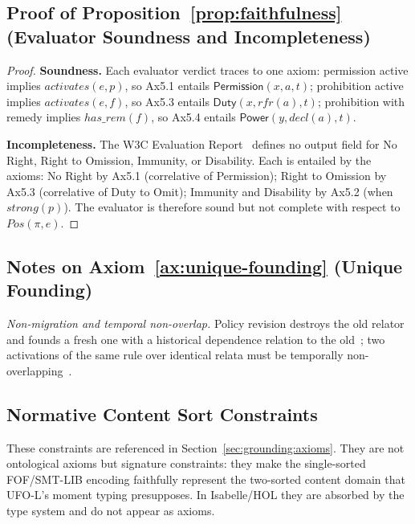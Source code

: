 \documentclass{IOS-Book-Article}
\newcommand{\activates}{\mathit{activates}}
\newcommand{\hasrem}{\mathit{has\_rem}}
\newcommand{\PermPos}{\mathsf{Permission}}   %
\newcommand{\Duty}{\mathsf{Duty}}            %
\newcommand{\Power}{\mathsf{Power}}          %
\theoremstyle{definition}
\begin{document}
\subsection*{Proof of Proposition~\ref{prop:faithfulness}
  (Evaluator Soundness and Incompleteness)}
\label{app:proof:faithfulness}

\begin{proof}

\textbf{Soundness.}
Each evaluator verdict traces to one axiom:
permission active implies $\activates(e,p)$,
so Ax5.1 entails $\PermPos(x,a,t)$;
prohibition active implies $\activates(e,f)$,
so Ax5.3 entails $\Duty(x,\mathit{rfr}(a),t)$;
prohibition with remedy implies $\hasrem(f)$,
so Ax5.4 entails $\Power(y,\mathit{decl}(a),t)$.

\textbf{Incompleteness.}
The W3C Evaluation Report~\cite[§2]{odrl-formal-semantics}
defines no output field for No Right, Right to Omission,
Immunity, or Disability. Each is entailed by the axioms:
No Right by Ax5.1 (correlative of Permission);
Right to Omission by Ax5.3 (correlative of Duty to Omit);
Immunity and Disability by Ax5.2 (when $\mathit{strong}(p)$).
The evaluator is therefore sound but not complete with
respect to $\mathit{Pos}(\pi,e)$.
\end{proof}

\subsection*{Notes on Axiom~\ref{ax:unique-founding} (Unique Founding)}
\label{app:notes}
\noindent\textit{Non-migration and temporal non-overlap.}
Policy revision destroys the old relator and founds a fresh one
with a historical dependence relation to the old~\cite{Guizzardi2022-PORUUF,Guizzardi2005ofscm};
two activations of the same rule over identical relata must be
temporally non-overlapping~\cite{Guizzardi2022-PORUUF}.

\subsection*{Normative Content Sort Constraints}
\label{app:sorts}
\noindent These constraints are referenced in
Section~\ref{sec:grounding:axioms}. They are not ontological
axioms but signature constraints: they make the single-sorted
FOF/SMT-LIB encoding faithfully represent the two-sorted
content domain that UFO-L's moment typing presupposes.
In Isabelle/HOL they are absorbed by the type system and
do not appear as axioms.
\end{document}
